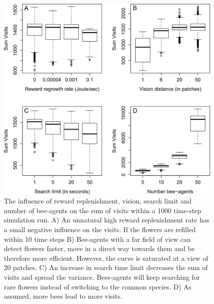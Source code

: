 \clearpage

\begin{figure} [h!]
	\centering
	\includegraphics[width=14cm]{Images/SA_SUM}
	\caption{The influence of reward replenishment, vision, search limit and number of bee-agents on the sum of visits within a 1000 time-step simulation run. A) An unnatural high reward replenishment rate has a small negative influence on the visits. If the flowers are refilled within 10 time steps B) Bee-agents with a far field of view can detect flowers faster, move in a direct way towards them and be therefore more efficient. However, the curve is saturated at a view of 20 patches. C) An increase in search time limit decreases the sum of visits and spread the variance. Bees-agents will keep searching for rare flowers instead of switching to the common species. D) As assumed, more bees lead to more visits.} 
	\label{fig:SA_SUM}
\end{figure}

\clearpage

